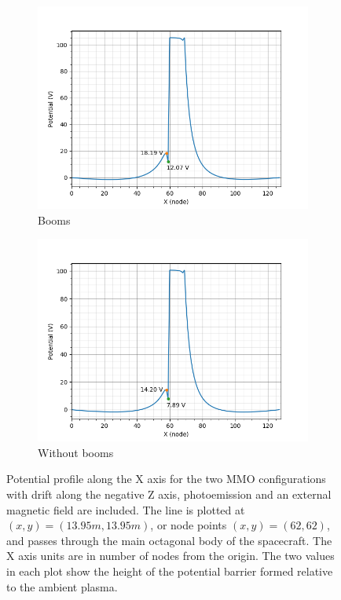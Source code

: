 \begin{figure}[H]
  \begin{subfigure}[b]{0.6\textwidth}
  \includegraphics[width=\textwidth]{figures/MMO/BField/WB/L_BField_WB.png}
  \caption{Booms}
  \label{fig:L_BField_WB}
\end{subfigure}
\begin{subfigure}[b]{0.6\textwidth}
  \includegraphics[width=\textwidth]{figures/MMO/BField/NB/L_BField_NB.png}
  \caption{Without booms}
  \label{fig:L_BField_NB}
\end{subfigure}
\caption{Potential profile along the X axis for the two MMO configurations with drift along the negative Z axis, photoemission and an external magnetic field are included. The line is plotted at $(x,y) = (13.95 m, 13.95 m)$, or node points $(x,y) = (62,62)$, and passes through the main octagonal body of the spacecraft. The X axis units are in number of nodes from the origin. The two values in each plot show the height of the potential barrier formed relative to the ambient plasma.}
\label{fig:Line_BField}
\end{figure}

